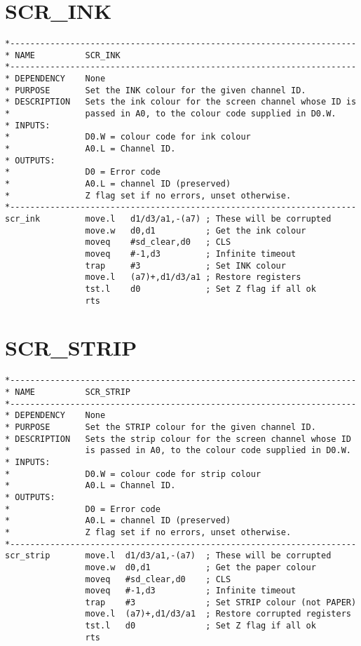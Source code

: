 \section{SCR\_INK}
\label{ch9-SCR_INK}%

\begin{lstlisting}[firstnumber=1,caption={SCR\_INK}]
*---------------------------------------------------------------------
* NAME          SCR_INK
*---------------------------------------------------------------------
* DEPENDENCY    None
* PURPOSE       Set the INK colour for the given channel ID.
* DESCRIPTION   Sets the ink colour for the screen channel whose ID is 
*               passed in A0, to the colour code supplied in D0.W.
* INPUTS:
*               D0.W = colour code for ink colour
*               A0.L = Channel ID.
* OUTPUTS:
*               D0 = Error code
*               A0.L = channel ID (preserved)
*               Z flag set if no errors, unset otherwise.
*---------------------------------------------------------------------
scr_ink         move.l   d1/d3/a1,-(a7) ; These will be corrupted
                move.w   d0,d1          ; Get the ink colour
                moveq    #sd_clear,d0   ; CLS
                moveq    #-1,d3         ; Infinite timeout
                trap     #3             ; Set INK colour
                move.l   (a7)+,d1/d3/a1 ; Restore registers
                tst.l    d0             ; Set Z flag if all ok
                rts
\end{lstlisting}

\section{SCR\_STRIP}
\label{ch9-SCR_STRIP}%

\begin{lstlisting}[firstnumber=1,caption={SCR\_STRIP}]
*---------------------------------------------------------------------
* NAME          SCR_STRIP
*---------------------------------------------------------------------
* DEPENDENCY    None
* PURPOSE       Set the STRIP colour for the given channel ID.
* DESCRIPTION   Sets the strip colour for the screen channel whose ID 
*               is passed in A0, to the colour code supplied in D0.W.
* INPUTS:
*               D0.W = colour code for strip colour
*               A0.L = Channel ID.
* OUTPUTS:
*               D0 = Error code
*               A0.L = channel ID (preserved)
*               Z flag set if no errors, unset otherwise.
*---------------------------------------------------------------------
scr_strip       move.l  d1/d3/a1,-(a7)  ; These will be corrupted 
                move.w  d0,d1           ; Get the paper colour
                moveq   #sd_clear,d0    ; CLS
                moveq   #-1,d3          ; Infinite timeout
                trap    #3              ; Set STRIP colour (not PAPER)
                move.l  (a7)+,d1/d3/a1  ; Restore corrupted registers
                tst.l   d0              ; Set Z flag if all ok
                rts
\end{lstlisting}

